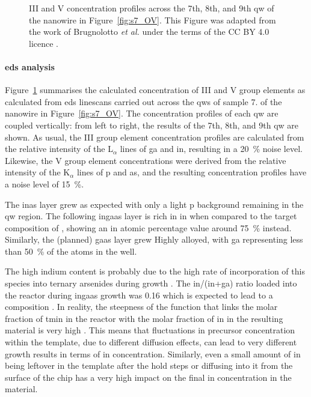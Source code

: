 \begin{figure}
{
    }
    \caption[III and V concentration profiles across the 7th, 8th, and 9th \acl{qw} of the nanowire cross section cut from sample 7.]{ III and  V concentration profiles across the 7th, 8th, and 9th \acl{qw} of the nanowire in Figure~\ref{fig:s7_OV}. This Figure was adapted from the work of Brugnolotto \textit{et al.} \cite{Brugnolotto2023_2} under the terms of the CC BY 4.0 licence \cite{CCBY40}.}
    \label{fig:s7_EDS}
\end{figure}

\paragraph{\acs{eds} analysis} Figure~\ref{fig:s7_EDS} summarises the calculated concentration of III and V group elements as calculated from \acs{eds} linescans carried out across the \acl{qw}s of sample 7. of the nanowire in Figure~\ref{fig:s7_OV}. The concentration profiles of each \acl{qw} are coupled vertically: from left to right, the results of the 7th, 8th, and 9th \acl{qw} are shown. As usual, the III group element concentration profiles are calculated from the relative intensity of the L\(_\alpha\) lines of \acl{ga} and \acs{in}, resulting in a \qty{20}{\%} noise level. Likewise, the V group element concentrations were derived from the relative intensity of the K\(_\alpha\) lines of \acl{p} and \acl{as}, and the resulting concentration profiles have a noise level of \qty{15}{\%}.

The \acs{inas} layer grew as expected with only a light \acl{p} background remaining in the \acl{qw} region. The following \acs{ingaas} layer is rich in \acl{in} when compared to the target composition of , showing an \acl{in} atomic percentage value around \qty{75}{\%} instead. Similarly, the (planned) \acs{gaas} layer grew Highly alloyed, with \acl{ga} representing less than \qty{50}{\%} of the atoms in the well. 

The high indium content is probably due to the high rate of incorporation of this species into ternary arsenides during  growth \cite{Borg2019}. The \acs{in}/(\acs{in}+\acs{ga}) ratio loaded into the reactor during \acs{ingaas} growth was \num{0.16} which is expected to lead to a  composition \cite{Borg2019}. In reality, the steepness of the function that links the molar fraction of \acf{tmin} in the reactor with the molar fraction of \acl{in} in the resulting material is very high \cite{Borg2019}. This means that fluctuations in precursor concentration within the template, due to different diffusion effects, can lead to very different growth results in terms of \acl{in} concentration. Similarly, even a small amount of \acl{in} being leftover in the template after the hold steps or diffusing into it from the surface of the chip has a very high impact on the final \acl{in} concentration in the material. 

